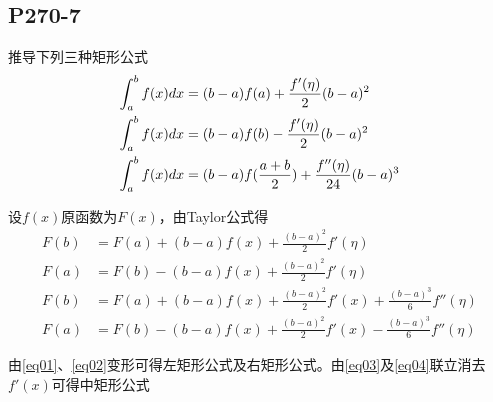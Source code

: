 \subsection{P270-7}
推导下列三种矩形公式
\begin{align*}
\int_{a}^{b} {f(x)} d{x} & = (b - a)f(a) + \frac{f'(\eta)}{2}(b-a)^2 \\
\int_{a}^{b} {f(x)} d{x} & = (b - a)f(b) - \frac{f'(\eta)}{2}(b-a)^2 \\
\int_{a}^{b} {f(x)} d{x} & = (b - a)f(\frac{a + b}{2}) + \frac{f''(\eta)}{24}(b-a)^3
\end{align*}
\begin{SOLVE}
设$f(x)$原函数为$F(x)$，由Taylor公式得
\begin{align}
F(b) & = F(a) + (b-a) f(x) + \frac{(b-a)^2}{2} f'(\eta) \label{eq01}\\
F(a) & = F(b) - (b-a) f(x) + \frac{(b-a)^2}{2} f'(\eta) \label{eq02}\\
F(b) & = F(a) + (b-a) f(x) + \frac{(b-a)^2}{2} f'(x) + \frac{(b-a)^3}{6}f''(\eta) \label{eq03}\\
F(a) & = F(b) - (b-a) f(x) + \frac{(b-a)^2}{2} f'(x) - \frac{(b-a)^3}{6}f''(\eta) \label{eq04}
\end{align}

由\eqref{eq01}、\eqref{eq02}变形可得左矩形公式及右矩形公式。由\eqref{eq03}及\eqref{eq04}联立消去$f'(x)$可得中矩形公式

\end{SOLVE}